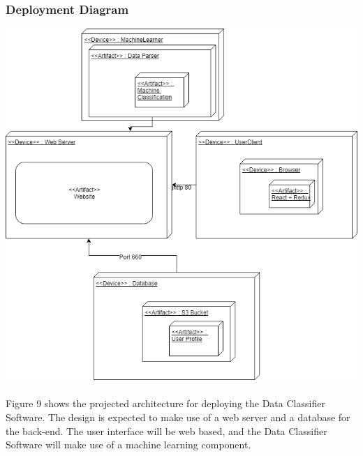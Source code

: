\documentclass[12pt,oneside,letterpaper]{article}
\begin{document}
 \subsubsection{Deployment Diagram}
\includegraphics[scale = 0.60]{bread_deployment_diagram.png}
\begingroup
{}
\endgroup

\paragraph{}Figure 9 shows the projected architecture for deploying the Data Classifier Software. The design is expected to make use of a web server and a database for the back-end. The user interface will be web based, and the Data Classifier Software will make use of a machine learning component.
\end{document}
